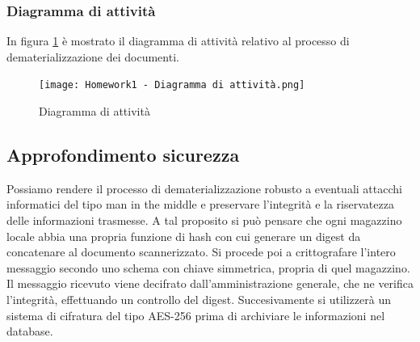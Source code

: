 \documentclass{article}
\begin{document}
\subsubsection{Diagramma di attività}
In figura \ref{fig:2} è mostrato il diagramma di attività relativo al processo di dematerializzazione dei documenti.
\begin{figure}[H]
    \centering
    \texttt{[image: Homework1 - Diagramma di attività.png]}
    \caption{Diagramma di attività}
    \label{fig:2}
\end{figure}

\subsection{Approfondimento sicurezza}
Possiamo rendere il processo di dematerializzazione robusto a eventuali attacchi informatici del tipo man in the middle e preservare l'integrità e la riservatezza delle informazioni trasmesse. A tal proposito si può pensare che ogni magazzino locale abbia una propria funzione di hash con cui generare un digest da concatenare al documento scannerizzato. Si procede poi a crittografare l'intero messaggio secondo uno schema con chiave simmetrica, propria di quel magazzino. Il messaggio ricevuto viene decifrato dall'amministrazione generale, che ne verifica l'integrità, effettuando un controllo del digest. Succesivamente si utilizzerà un sistema di cifratura del tipo AES-256 prima di archiviare le informazioni nel database. 
\end{document}
